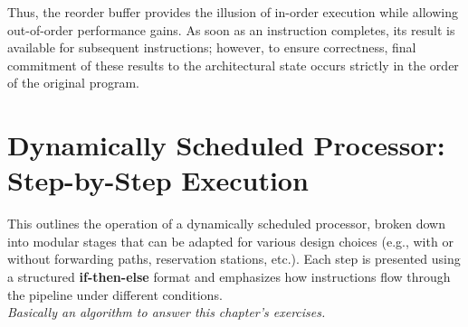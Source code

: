 Thus, the reorder buffer provides the illusion of in-order execution while allowing out-of-order performance gains. As soon as an instruction completes, its result is available for subsequent instructions; however, to ensure correctness, final commitment of these results to the architectural state occurs strictly in the order of the original program.
\newpage
\section*{Dynamically Scheduled Processor: Step-by-Step Execution}
\vspace{-5px}
This outlines the operation of a dynamically scheduled processor, broken down into modular stages that can be adapted for various design choices (e.g., with or without forwarding paths, reservation stations, etc.). Each step is presented using a structured \textbf{if-then-else} format and emphasizes how instructions flow through the pipeline under different conditions. \\
\textit{Basically an algorithm to answer this chapter's exercises.}
\vspace{-15px}
